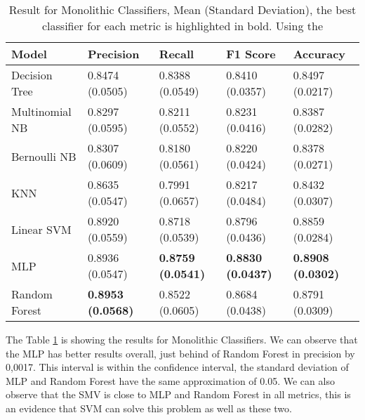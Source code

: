 \begin{table}[h!]
    \centering
    \renewcommand{\arraystretch}{1.8}
    \begin{tabular}{ p{3cm}p{2.8cm}p{2.8cm}p{2.8cm}p{2.8cm} }
        \toprule
        Model & Precision & Recall & F1 Score & Accuracy \\
        \midrule
        Decision Tree & 0.8474 (0.0505) & 0.8388 (0.0549) & 0.8410 (0.0357) & 0.8497 (0.0217) \\
        Multinomial NB & 0.8297 (0.0595) & 0.8211 (0.0552) & 0.8231 (0.0416) & 0.8387 (0.0282) \\
        Bernoulli NB & 0.8307 (0.0609) & 0.8180 (0.0561) & 0.8220 (0.0424) & 0.8378 (0.0271) \\
        KNN & 0.8635 (0.0547) & 0.7991 (0.0657) & 0.8217 (0.0484) & 0.8432 (0.0307) \\
        Linear SVM & 0.8920 (0.0559) & 0.8718 (0.0539) & 0.8796 (0.0436) & 0.8859 (0.0284) \\
        MLP & 0.8936 (0.0547) & \textbf{0.8759 (0.0541)} & \textbf{0.8830 (0.0437)} & \textbf{0.8908 (0.0302)} \\
        Random Forest & \textbf{0.8953 (0.0568)} & 0.8522 (0.0605) & 0.8684 (0.0438) & 0.8791 (0.0309) \\ [1ex]
        \bottomrule
        \end{tabular}
        \caption{%
        Result for Monolithic Classifiers, Mean (Standard Deviation), the best classifier for each metric is highlighted in bold. Using the %
        }\label{table:result_monolithic}
\end{table}

The Table \ref{table:result_monolithic} is showing the results for Monolithic Classifiers. We can observe that the MLP has better results overall, just behind of Random Forest in precision by 0,0017. This interval is within the confidence interval, the standard deviation of MLP and Random Forest have the same approximation of 0.05. We can also observe that the SMV is close to MLP and Random Forest in all metrics, this is an evidence that SVM can solve this problem as well as these two.